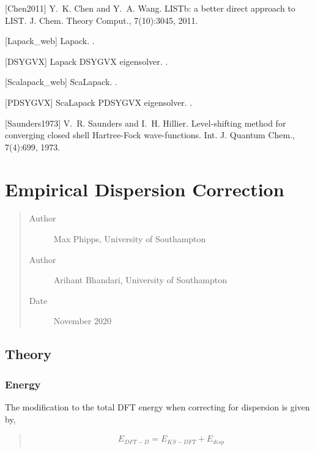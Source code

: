 \documentclass[letterpaper,10pt,english]{sphinxmanual}
\begin{document}
{[}Chen2011{]} Y. K. Chen and Y. A. Wang. LISTb: a better direct approach to LIST. J. Chem. Theory Comput., 7(10):3045, 2011.

{[}Lapack\_web{]} Lapack. .

{[}DSYGVX{]} Lapack DSYGVX eigensolver. .

{[}Scalapack\_web{]} ScaLapack. .

{[}PDSYGVX{]} ScaLapack PDSYGVX eigensolver. .

{[}Saunders1973{]} V. R. Saunders and I. H. Hillier. Level-shifting method for converging closed shell Hartree-Fock wave-functions. Int. J. Quantum Chem., 7(4):699, 1973.


\section{Empirical Dispersion Correction}
\label{\detokenize{VDW-correction::doc}}\label{\detokenize{VDW-correction:empirical-dispersion-correction}}\begin{quote}\begin{description}
\item[{Author}] \leavevmode
Max Phipps, University of Southampton

\item[{Author}] \leavevmode
Arihant Bhandari, University of Southampton

\item[{Date}] \leavevmode
November 2020

\end{description}\end{quote}


\subsection{Theory}
\label{\detokenize{VDW-correction:theory}}

\subsubsection{Energy}
\label{\detokenize{VDW-correction:energy}}
The modification to the total DFT energy when correcting for
dispersion is given by,
\begin{quote}
\label{\detokenize{VDW-correction:equation-disp-corr}}\begin{equation}\label{equation:VDW-correction:disp_corr}
\begin{split}  E_{DFT-D} = E_{KS-DFT} + E_{disp}\end{split}
\end{equation}\end{quote}
\end{document}
